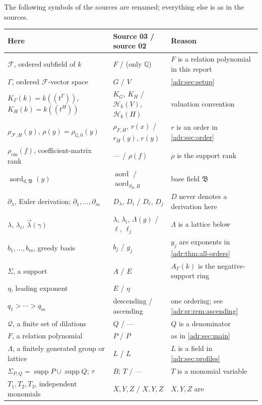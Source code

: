 \documentclass[11pt,letterpaper]{article}
\numberwithin{equation}{section}
\theoremstyle{definition}
\theoremstyle{remark}
\newcommand{\Q}{\mathbb Q}
\newcommand{\A}{A_\Gamma(k)}
\newcommand{\K}{K_\Gamma(k)}
\newcommand{\supp}{\operatorname{supp}}
\begin{document}
The following symbols of the sources are renamed; everything else is as in
the sources.
\begin{center}\small
\begin{tabularx}{\textwidth}{@{}P{0.30\textwidth}P{0.25\textwidth}Y@{}}
\toprule
Here & Source 03 / source 02 & Reason\\
\midrule
$\mathcal F$, ordered subfield of $k$ & $F$ / (only $\Q$) & $F$ is a relation
polynomial in this report\\
$\Gamma$, ordered $\mathcal F$-vector space & $G$ / $V$ & \cref{adr:sec:setup}\\
$\K=k((t^\Gamma))$, $K_H(k)=k((t^H))$ & $K_G$, $K_H$ / $\mathscr H_k(V)$,
$\mathscr H_k(H)$ & valuation convention\\
$\rho_{\mathcal F,H}(y)$, $\rho(y)=\rho_{\Q,0}(y)$ & $\rho_{F,H}$, $r(x)$ /
$r_H(y)$, $r(y)$ & $r$ is an order in \cref{adr:sec:order}\\
$\rho_{\mathrm{cm}}(f)$, coefficient-matrix rank & --- / $\rho(f)$ &
$\rho$ is the support rank\\
$\operatorname{aord}_{d,\mathfrak B}(y)$ & $\operatorname{aord}$ /
$\operatorname{aord}_{S_d,B}$ & base field $\mathfrak B$\\
$\partial_\lambda$, Euler derivation; $\partial_1,\ldots,\partial_m$ &
$D_\lambda$, $D_i$ / $D_\ell$, $D_j$ & $D$ never denotes a derivation here\\
$\lambda$, $\lambda_i$, $\vec\lambda(\gamma)$ & $\lambda$, $\lambda_i$,
$\Lambda(g)$ / $\ell$, $\ell_j$ & $\Lambda$ is a lattice below\\
$b_1,\ldots,b_m$, greedy basis & $b_j$ / $g_j$ & $g_j$ are exponents in
\cref{adr:thm:all-orders}\\
$\Sigma$, a support & $A$ / $E$ & $\A$ is the negative-support ring\\
$\eta$, leading exponent & $E$ / $\eta$ & \\
$q_1>\cdots>q_m$ & descending / ascending & one ordering; see
\cref{adr:sr:rem:ascending}\\
$\mathcal Q$, a finite set of dilations & $Q$ / --- & $Q$ is a denominator\\
$F$, a relation polynomial & $P$ / $P$ & as in \cref{adr:sec:main}\\
$\Lambda$, a finitely generated group or lattice & $L$ / $L$ & $L$ is a
field in \cref{adr:sec:profiles}\\
$\Sigma_{P,Q}=\supp P\cup\supp Q$; $\tau$ & $B$; $T$ / --- & $T$ is a
monomial variable\\
$T_1,T_2,T_3$, independent monomials & $X,Y,Z$ / $X,Y,Z$ & $X,Y,Z$ are

\end{tabularx}
\end{center}
\end{document}

